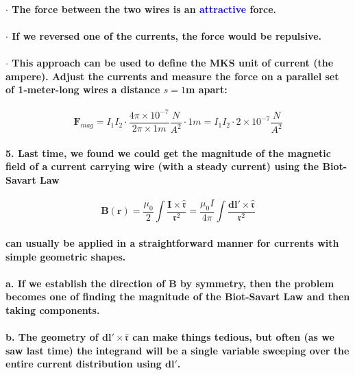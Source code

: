 \documentclass{article}
\begin{document}
\paragraph{\indent $\cdot$ The force between the two wires is an \textcolor{blue}{attractive} force.}
\paragraph{\indent $\cdot$ If we reversed one of the currents, the force would be repulsive.}
\paragraph{\indent $\cdot$ This approach can be used to define the MKS unit of current (the ampere). Adjust the currents and measure the force on a parallel set of 1-meter-long wires a distance $s=1$m apart:}
\begin{equation*}
    \boldsymbol{F}_{mag}=I_1I_2\cdot \frac{4\pi\times10^{-7}}{2\pi \times1 m}\frac{N}{A^2}\cdot 1m=I_1I_2\cdot 2\times 10^{-7} \frac{N}{A^2}
\end{equation*}
\paragraph{5. Last time, we found we could get the magnitude of the magnetic field of a current carrying wire (with a steady current) using the Biot-Savart Law}
\begin{equation*}
    \boldsymbol{B}(\boldsymbol{r})=\frac{\mu_0}{2}\int\frac{\boldsymbol{I}\times\hat{\boldsymbol{\mathfrak{r}}}}{\mathfrak{r}^2}=\frac{\mu_0I}{4\pi}\int\frac{\boldsymbol{dl'}\times\hat{\boldsymbol{\mathfrak{r}}}}{\mathfrak{r}^2}
\end{equation*}
\paragraph{can usually be applied in a straightforward manner for currents with simple geometric shapes.}
\paragraph{\indent a. If we establish the direction of $\boldsymbol{B}$ by symmetry, then the problem becomes one of finding the magnitude of the Biot-Savart Law and then taking components.}
\paragraph{\indent b. The geometry of $\boldsymbol{dl}'\times\hat{\boldsymbol{\mathfrak{r}}}$ can make things tedious, but often (as we saw last time) the integrand will be a single variable sweeping over the entire current distribution using $\boldsymbol{dl}'$.}
\end{document}
